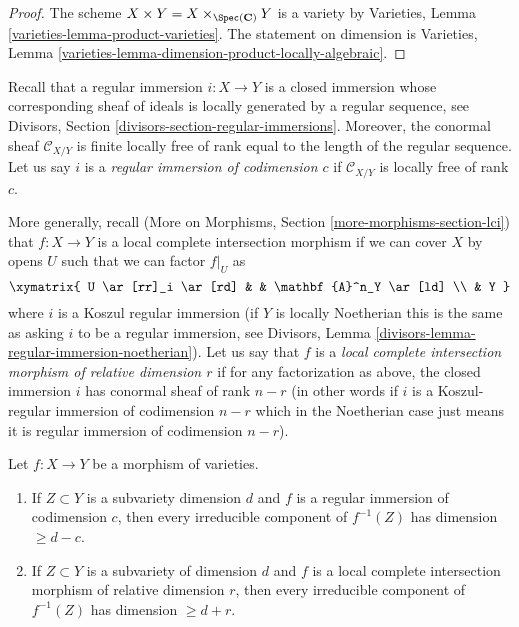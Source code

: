 \begin{proof}
The scheme $X \times Y = X \times_{\Spec(\mathbf{C})} Y$ is a variety by
Varieties, Lemma \ref{varieties-lemma-product-varieties}.
The statement on dimension is
Varieties, Lemma \ref{varieties-lemma-dimension-product-locally-algebraic}.
\end{proof}

\medskip\noindent
Recall that a regular immersion $i : X \to Y$ is a closed immersion whose
corresponding sheaf of ideals is locally generated by a regular sequence, see
Divisors, Section \ref{divisors-section-regular-immersions}.
Moreover, the conormal sheaf $\mathcal{C}_{X/Y}$ is finite locally free of
rank equal to the length of the regular sequence. Let us say $i$ is a
{\it regular immersion of codimension $c$}
if $\mathcal{C}_{X/Y}$ is locally free of rank $c$.

\medskip\noindent
More generally, recall
(More on Morphisms, Section \ref{more-morphisms-section-lci})
that $f : X \to Y$ is a local complete intersection
morphism if we can cover $X$ by opens $U$ such that we can factor
$f|_U$ as
$$
\xymatrix{
U \ar[rr]_i \ar[rd] & & \mathbf{A}^n_Y \ar[ld] \\
& Y
}
$$
where $i$ is a Koszul regular immersion (if $Y$ is locally Noetherian
this is the same as asking $i$ to be a regular immersion, see
Divisors, Lemma \ref{divisors-lemma-regular-immersion-noetherian}).
Let us say that $f$ is a {\it local complete intersection morphism
of relative dimension $r$} if for any factorization as above, the
closed immersion $i$ has conormal sheaf of rank $n - r$ (in other
words if $i$ is a Koszul-regular immersion of codimension $n - r$
which in the Noetherian case just means it is regular immersion of
codimension $n - r$).

\begin{lemma}
\label{lemma-pullback-by-regular-immersion}
Let $f : X \to Y$ be a morphism of varieties.
\begin{enumerate}
\item If $Z \subset Y$ is a subvariety dimension $d$ and $f$ is a regular
immersion of codimension $c$, then every irreducible component
of $f^{-1}(Z)$ has dimension $\geq d - c$.
\item If $Z \subset Y$ is a subvariety of dimension $d$ and
$f$ is a local complete intersection morphism of relative dimension $r$,
then every irreducible component of $f^{-1}(Z)$ has dimension $\geq d + r$.
\end{enumerate}
\end{lemma}

